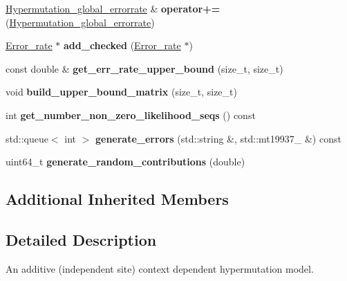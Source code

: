 \begin{DoxyCompactItemize}
\hyperlink{classHypermutation__global__errorrate}{Hypermutation\+\_\+global\+\_\+errorrate} \& {\bfseries operator+=} (\hyperlink{classHypermutation__global__errorrate}{Hypermutation\+\_\+global\+\_\+errorrate})
\item 
\mbox{\label{classHypermutation__global__errorrate_a55637ff82bc7c8c313520c6666194b99}} 
\hyperlink{classError__rate}{Error\+\_\+rate} $\ast$ {\bfseries add\+\_\+checked} (\hyperlink{classError__rate}{Error\+\_\+rate} $\ast$)
\item 
\mbox{\label{classHypermutation__global__errorrate_ae99d42204a7dd7315582150f4d474353}} 
const double \& {\bfseries get\+\_\+err\+\_\+rate\+\_\+upper\+\_\+bound} (size\+\_\+t, size\+\_\+t)
\item 
\mbox{\label{classHypermutation__global__errorrate_ace4d25eb33bddf01dbf1e771f8997b5d}} 
void {\bfseries build\+\_\+upper\+\_\+bound\+\_\+matrix} (size\+\_\+t, size\+\_\+t)
\item 
\mbox{\label{classHypermutation__global__errorrate_a7ae06e4aa431aefc2386a74939778c10}} 
int {\bfseries get\+\_\+number\+\_\+non\+\_\+zero\+\_\+likelihood\+\_\+seqs} () const
\item 
\mbox{\label{classHypermutation__global__errorrate_a4783b1ad113de7c77712c996ff0a1b3c}} 
std\+::queue$<$ int $>$ {\bfseries generate\+\_\+errors} (std\+::string \&, std\+::mt19937\+\_ \&) const
\item 
\mbox{\label{classHypermutation__global__errorrate_a10b75cea037da01947037a74b86a5653}} 
uint64\+\_\+t {\bfseries generate\+\_\+random\+\_\+contributions} (double)
\end{DoxyCompactItemize}
\subsection*{Additional Inherited Members}


\subsection{Detailed Description}
An additive (independent site) context dependent hypermutation model. 

